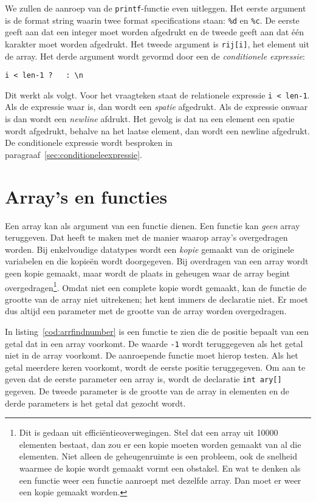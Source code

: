 We zullen de aanroep van de \texttt{printf}-functie even uitleggen. Het eerste argument is de format string waarin twee format specifications staan: \texttt{\%d} en \texttt{\%c}. De eerste geeft aan dat een integer moet worden afgedrukt en de tweede geeft aan dat één karakter moet worden afgedrukt. Het tweede argument is \texttt{rij[i]}, het element uit de array. Het derde argument wordt gevormd door een de \textsl{conditionele expressie}:

\hspace*{1em}\texttt{i < len-1 ? \textquotesingle\ \textquotesingle\ : \textquotesingle\textbackslash n\textquotesingle}

Dit werkt als volgt. Voor het vraagteken staat de relationele expressie \texttt{i < len-1}. Als de expressie waar is, dan wordt een \textsl{spatie} afgedrukt. Als de expressie onwaar is dan wordt een \textsl{newline} afdrukt. Het gevolg is dat na een element een spatie wordt afgedrukt, behalve na het laatse element, dan wordt een newline afgedrukt. De conditionele expressie wordt besproken in paragraaf~\ref{sec:conditioneleexpressie}.


\section{Array's en functies}
Een array kan als argument van een functie dienen. Een functie kan \textsl{geen} array teruggeven. Dat heeft te maken met de manier waarop array's overgedragen worden. Bij enkelvoudige datatypes wordt een \textsl{kopie} gemaakt van de originele variabelen en die kopieën wordt doorgegeven. Bij overdragen van een array wordt geen kopie gemaakt, maar wordt de plaats in geheugen waar de array begint overgedragen\footnote{Dit is gedaan uit efficiëntieoverwegingen. Stel dat een array uit 10000 elementen bestaat, dan zou er een kopie moeten worden gemaakt van al die elementen. Niet alleen de geheugenruimte is een probleem, ook de snelheid waarmee de kopie wordt gemaakt vormt een obstakel. En wat te denken als een functie weer een functie aanroept met dezelfde array. Dan moet er weer een kopie gemaakt worden.}. Omdat niet een complete kopie wordt gemaakt, kan de functie de grootte van de array niet uitrekenen; het kent immers de declaratie niet. Er moet dus altijd een parameter met de grootte van de array worden overgedragen.

In listing~\ref{cod:arrfindnumber} is een functie te zien die de positie bepaalt van een getal dat in een array voorkomt. De waarde \texttt{-1} wordt teruggegeven als het getal niet in de array voorkomt. De aanroepende functie moet hierop testen. Als het getal meerdere keren voorkomt, wordt de eerste positie teruggegeven. Om aan te geven dat de eerste parameter een array is, wordt de declaratie \texttt{int ary[]} gegeven. De tweede parameter is de grootte van de array in elementen en de derde parameters is het getal dat gezocht wordt.

